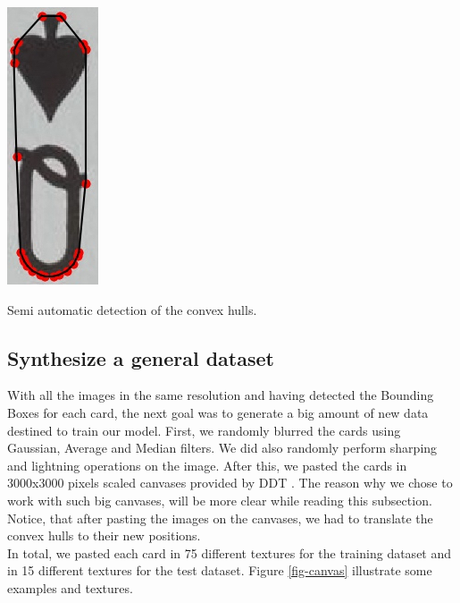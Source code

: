 \documentclass[a4paper]{article}
\begin{document}
\begin{minipage}{\columnwidth}
{\includegraphics[scale=0.74]{images/qs_2_2}  }
\caption{Semi automatic detection of the convex hulls.}
\label{fig-data-prep}
\end{minipage}

\subsection{Synthesize a general dataset}
With all the images in the same resolution and having detected the Bounding Boxes for each card, the next goal was to generate a big amount of new data destined to train our model. 
First, we randomly blurred the cards using Gaussian, Average and Median filters.  We did also randomly perform sharping and lightning operations on the image.  After this, we pasted the cards in 3000x3000 pixels scaled canvases provided by DDT \cite{cimpoi14describing}.  The reason why we chose to work with such big canvases, will be more clear while reading this subsection.  Notice, that after pasting the images on the canvases, we had to translate the convex hulls to their new positions.\\
In total, we pasted each card in 75 different textures for the training dataset and in 15 different textures for the test dataset.  Figure \ref{fig-canvas} illustrate some examples and textures.
\end{document}
